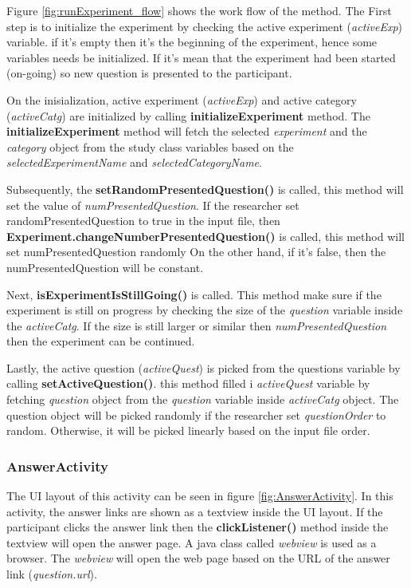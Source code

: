 Figure \ref{fig:runExperiment_flow} shows the work flow of the method. The First step is to initialize the experiment by checking the active experiment (\textit{activeExp}) variable.
   if it's empty then it's the beginning of the experiment, hence some variables needs be initialized. If it's mean that the experiment had been started (on-going)
 so new question is presented to the participant.


On the inisialization, active experiment (\textit{activeExp}) and active category (\textit{activeCatg}) are initialized by calling \textbf{initializeExperiment} method.
The \textbf{initializeExperiment} method will fetch the selected \textit{experiment} and the
\textit{category} object from the study class variables based on the \textit{selectedExperimentName} and \textit{selectedCategoryName}.


Subsequently, the \textbf{setRandomPresentedQuestion()} is called, this method will set the value of \textit{numPresentedQuestion}.
If the researcher set randomPresentedQuestion to true in the input file, then \textbf{Experiment.changeNumberPresentedQuestion()} is called, this method will set numPresentedQuestion randomly
On the other hand, if it's false, then the numPresentedQuestion will be constant.

Next, \textbf{isExperimentIsStillGoing()} is called. This method make sure if the experiment is still on progress by checking the size of the
\textit{question} variable inside the \textit{activeCatg}. If the size is still larger or similar then \textit{numPresentedQuestion} then the experiment can be continued.

Lastly, the active question (\textit{activeQuest}) is picked from the questions variable by calling \textbf{setActiveQuestion()}. this method filled
 i \textit{activeQuest} variable by fetching \textit{question} object from the \textit{question} variable inside \textit{activeCatg} object.
  The question object will be picked randomly if the researcher set \textit{questionOrder} to random. Otherwise, it will be picked linearly based on
  the input file order.


\subsubsection{AnswerActivity}
The UI layout of this activity can be seen in figure \ref{fig:AnswerActivity}.
In this activity, the answer links are shown as a textview inside the UI layout. If the participant clicks the answer
link then the \textbf{clickListener()} method inside the textview will open the answer page.
A java class called \textit{webview} is used as a browser. The \textit{webview} will open the web page based on the URL of the answer link (\textit{question.url}).

